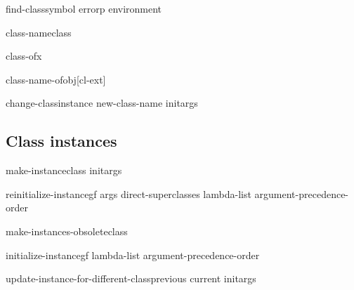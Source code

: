\documentclass[10pt,english]{book}
\begin{document}
\begin{accessor}{find-class}{symbol \op errorp environment}
  
\end{accessor}

\begin{generic}{class-name}{class}
  
\end{generic}

\begin{function}{class-of}{x}
  
\end{function}

\begin{function}{class-name-of}{obj}[cl-ext]
  
\end{function}

\begin{generic}{change-class}{instance new-class-name \rest initargs \akeys}
  
\end{generic}

\subsection{Class instances}
\label{sec:class-instances}

\begin{generic}{make-instance}{class \rest initargs \akeys}
  
\end{generic}

\begin{generic}{reinitialize-instance}{gf \rest args \key
    direct-superclasses lambda-list argument-precedence-order \akeys}
  
\end{generic}

\begin{generic}{make-instances-obsolete}{class}
  
\end{generic}

\begin{generic}{initialize-instance}{gf \key lambda-list argument-precedence-order \akeys}
  
\end{generic}

\begin{generic}{update-instance-for-different-class}{previous current \rest initargs}
  
\end{generic}
\end{document}
